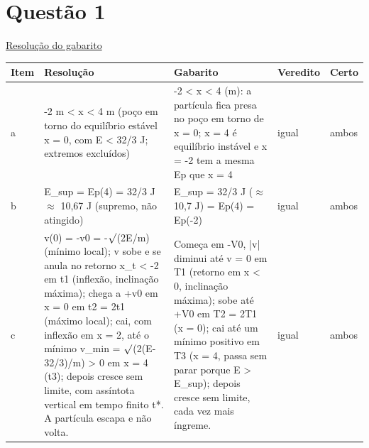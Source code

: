 \documentclass{article}%
\begin{document}
\section*{Questão 1}%
\href{https://poliedroresolve.sistemapoliedro.com.br/vestibulares/ime/2026/ime-2-fase-dia-2-24-10-2025-2-fase-dia-2/dissertativa-1-fisica-2-fase-dia-2-ime-2026}{Resolução do gabarito}\par\smallskip%
\begin{longtable}{@{}p{} p{} p{} p{} p{}@{}}\toprule Item & Resolução & Gabarito & Veredito & Certo \\ \midrule
a & {-}2 m < x < 4 m (poço em torno do equilíbrio estável x = 0, com E < 32/3 J; extremos excluídos) & {-}2 < x < 4 (m): a partícula fica presa no poço em torno de x = 0; x = 4 é equilíbrio instável e x = {-}2 tem a mesma Ep que x = 4 & igual & ambos \\
b & E\_sup = Ep(4) = 32/3 J $\approx$ 10,67 J (supremo, não atingido) & E\_sup = 32/3 J ($\approx$ 10,7 J) = Ep(4) = Ep(-2) & igual & ambos \\
c & v(0) = -v0 = -$\surd$(2E/m) (mínimo local); v sobe e se anula no retorno x\_t < -2 em t1 (inflexão, inclinação máxima); chega a +v0 em x = 0 em t2 = 2t1 (máximo local); cai, com inflexão em x = 2, até o mínimo v\_min = $\surd$(2(E-32/3)/m) > 0 em x = 4 (t3); depois cresce sem limite, com assíntota vertical em tempo finito t*. A partícula escapa e não volta. & Começa em -V0, |v| diminui até v = 0 em T1 (retorno em x < 0, inclinação máxima); sobe até +V0 em T2 = 2T1 (x = 0); cai até um mínimo positivo em T3 (x = 4, passa sem parar porque E > E\_sup); depois cresce sem limite, cada vez mais íngreme. & igual & ambos \\
\bottomrule\end{longtable}%
\end{document}
